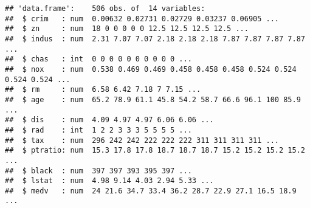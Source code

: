 \documentclass[
]{article}
\newenvironment{Shaded}{\begin{snugshade}}{\end{snugshade}}
\newcommand{\CommentTok}[1]{\textcolor[rgb]{0.56,0.35,0.01}{\textit{#1}}}
\newcommand{\DataTypeTok}[1]{\textcolor[rgb]{0.13,0.29,0.53}{#1}}
\newcommand{\FloatTok}[1]{\textcolor[rgb]{0.00,0.00,0.81}{#1}}
\newcommand{\KeywordTok}[1]{\textcolor[rgb]{0.13,0.29,0.53}{\textbf{#1}}}
\newcommand{\NormalTok}[1]{#1}
\newcommand{\OperatorTok}[1]{\textcolor[rgb]{0.81,0.36,0.00}{\textbf{#1}}}
\newcommand{\StringTok}[1]{\textcolor[rgb]{0.31,0.60,0.02}{#1}}
\begin{document}
\begin{Shaded}
\end{Shaded}

\begin{verbatim}
## 'data.frame':    506 obs. of  14 variables:
##  $ crim   : num  0.00632 0.02731 0.02729 0.03237 0.06905 ...
##  $ zn     : num  18 0 0 0 0 0 12.5 12.5 12.5 12.5 ...
##  $ indus  : num  2.31 7.07 7.07 2.18 2.18 2.18 7.87 7.87 7.87 7.87 ...
##  $ chas   : int  0 0 0 0 0 0 0 0 0 0 ...
##  $ nox    : num  0.538 0.469 0.469 0.458 0.458 0.458 0.524 0.524 0.524 0.524 ...
##  $ rm     : num  6.58 6.42 7.18 7 7.15 ...
##  $ age    : num  65.2 78.9 61.1 45.8 54.2 58.7 66.6 96.1 100 85.9 ...
##  $ dis    : num  4.09 4.97 4.97 6.06 6.06 ...
##  $ rad    : int  1 2 2 3 3 3 5 5 5 5 ...
##  $ tax    : num  296 242 242 222 222 222 311 311 311 311 ...
##  $ ptratio: num  15.3 17.8 17.8 18.7 18.7 18.7 15.2 15.2 15.2 15.2 ...
##  $ black  : num  397 397 393 395 397 ...
##  $ lstat  : num  4.98 9.14 4.03 2.94 5.33 ...
##  $ medv   : num  24 21.6 34.7 33.4 36.2 28.7 22.9 27.1 16.5 18.9 ...
\end{verbatim}
\end{document}
